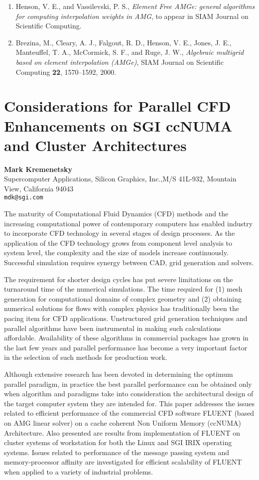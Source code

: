 \documentclass[11pt]{article}
\newcommand{\nextab}[4]{
	\section{#2}
	{\bf #1} \\ \nopagebreak
	{#3} \\ \nopagebreak
	{\tt #4} \nopagebreak
	}
\begin{document}
\begin{enumerate}

\item
Henson, V. E., and Vassilevski, P. S.,
{\em Element Free AMGe: general algorithms for computing
interpolation weights in AMG}, to appear in
SIAM Journal on Scientific Computing.

\item
Brezina, M., Cleary, A. J., Falgout, R. D., Henson, V. E., Jones,
J. E., Manteuffel, T. A., McCormick, S. F., and Ruge, J. W.,
{\em Algebraic multigrid based on element interpolation (AMGe)},
SIAM Journal on Scientific Computing
{\bf 22}, 1570--1592, 2000.


\end{enumerate}




\nextab
{Mark Kremenetsky}
{Considerations for Parallel CFD Enhancements on SGI ccNUMA and Cluster Architectures}
{Supercomputer Applications, Silicon Graphics, Inc.,M/S 41L-932, Mountain View, California 94043}
{mdk@sgi.com}


The maturity of Computational Fluid Dynamics (CFD) methods and
the increasing computational power of contemporary computers has
enabled industry to incorporate CFD technology in several stages
of design processes.  As the application of the CFD technology
grows from component level analysis to system level, the
complexity and the size of models increase continuously.
Successful simulation requires synergy between CAD, grid
generation and solvers.

The requirement for shorter design cycles has put severe
limitations on the turnaround time of the numerical
simulations.  The time required for (1) mesh generation for
computational domains of complex geometry and (2) obtaining
numerical solutions for flows with complex physics has
traditionally been the pacing item for CFD applications.
Unstructured grid generation techniques and parallel algorithms
have been instrumental in making such calculations affordable.
Availability of these algorithms in commercial packages has
grown in the last few years and parallel performance has become
a very important factor in the selection of such methods for
production work.

Although extensive research has been devoted in determining the
optimum parallel paradigm, in practice the best parallel
performance can be obtained only when algorithm and paradigms
take into consideration the architectural design of the target
computer system they are intended for.  This paper addresses the
issues related to efficient performance of the commercial CFD
software FLUENT (based on AMG linear solver) on a cache coherent
Non Uniform Memory (ccNUMA) Architecture.  Also presented are
results from implementation of FLUENT on cluster systems of
workstation for both the Linux and SGI IRIX operating systems.
Issues related to performance of the message passing system and
memory-processor affinity are investigated for efficient
scalability of FLUENT when applied to a variety of industrial
problems.
\end{document}
